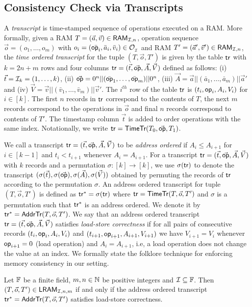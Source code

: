 \subsection{Consistency Check via Transcripts}\label{subsec:transcripts}
A {\em transcript} is time-stamped sequence of operations executed on a RAM.
More formally, given a RAM $T=(\vec{a},\vec{v})\in \mathsf{RAM}_{\mathcal{I}, {n}}$,
operation sequence $\vec{o}=(o_1,\ldots,o_m)$ with $o_i=(\bar{\mathsf{op}_i},\bar{a}_i,\bar{v}_i)\in \mathcal{O}_{{}_\mathcal{I}}$ and RAM $T'=(\vec{a}', \vec{v}')\in \mathsf{RAM}_{\mathcal{I}, {n}}$,
the {\em time ordered transcript} for the tuple $(T,\vec{o},T')$ is given by the table $\mathsf{tr}$ with $k=2n+m$ rows and four columns
$\mathsf{tr} = (\vec{t},\vec{\mathsf{op}},\vec{A},\vec{V})$  defined as follows: (i) $\vec{t}=\mathcal{I}_{k}=(1,\ldots,k)$,
(ii) $\vec{\mathsf{op}}=0^n||(\bar{\mathsf{op}}_1,\ldots,\bar{\mathsf{op}}_m)||0^n$,
(iii) $\vec{A}=\vec{a}||(\bar{a}_1,\ldots,\bar{a}_m)||\vec{a}'$ and
(iv) $\vec{V}=\vec{v}||(\bar{v}_1,\ldots,\bar{v}_m)||\vec{v}'$. The $i^{th}$ row of the table $\mathsf{tr}$ is
$(t_i,\mathsf{op}_i,A_i,V_i)$ for $i\in [k]$. The first $n$ records in $\mathsf{tr}$ correspond to the contents of $T$,
the next $m$ records correspond to the operations in $\vec{o}$ and final $n$
records correspond to contents of $T'$. The timestamp column $\vec{t}$ is added to order operations with the same index.
Notationally, we write $\mathsf{tr}=\mathsf{TimeTr}(T_0,\vec{\mathsf{op}},T_1)$.

We call a transcript $\mathsf{tr}=(\vec{t},\vec{\mathsf{op}},\vec{A},\vec{V})$ to be {\em address ordered} if $A_i\leq A_{i+1}$ for $i\in [k-1]$ and
$t_i < t_{i+1}$ whenever $A_i=A_{i+1}$. For a transcript $\mathsf{tr}=(\vec{t},\vec{\mathsf{op}},\vec{A},\vec{V})$ with $k$ records and a
permutation $\sigma:[k]\rightarrow [k]$, we use $\sigma(\mathsf{tr})$ to denote the transcript
$(\sigma(\vec{t}),\sigma(\vec{\mathsf{op}}),\sigma(\vec{A}),\sigma(\vec{V}))$
obtained by permuting the records of $\mathsf{tr}$ according to the permutation $\sigma$.
An address ordered transcript for tuple $(T,\vec{o},T')$ is defined as $\mathsf{tr}^\ast=\sigma(\mathsf{tr})$ where $\mathsf{tr}=\mathsf{TimeTr}(T,\vec{o},T')$ and $\sigma$ is
a permutation such that $\mathsf{tr}^\ast$ is an address ordered. We denote it by $\mathsf{tr}^\ast=\mathsf{AddrTr}(T,\vec{o},T')$.
We say that an address ordered transcript $\mathsf{tr}=(\vec{t},\vec{\mathsf{op}},\vec{A},\vec{V})$ satisfies {\em load-store correctness}
if for all pairs of consecutive records $(t_i,\mathsf{op}_i,A_i,V_i)$ and $(t_{i+1},\mathsf{op}_{i+1},A_{i+1},V_{i+1})$ we have $V_{i+1}=V_i$
whenever $\mathsf{op}_{i+1}=0$ (load operation) and
$A_i=A_{i+1}$, i.e, a load operation does not change the value at an index.
We formally state the folklore technique for enforcing memory consistency in our setting.
\begin{lemma}\label{lem:consistency-check}
Let $\mathbb{F}$ be a finite field, $m,n\in \mathbb{N}$ be positive integers and $\mathcal{I}\subseteq \mathbb{F}$. Then $(T,\vec{o},T')\in \mathsf{LRAM}_{\mathcal{I},n,m}$ if and only if
    the address ordered transcript $\mathsf{tr}^\ast=\mathsf{AddrTr}(T,\vec{o},T')$ satisfies load-store correctness.
\end{lemma}

